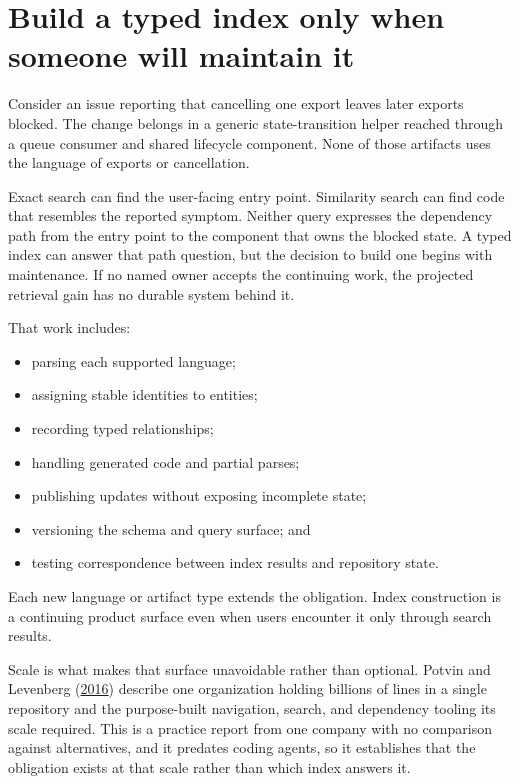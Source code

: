 \hypertarget{build-a-typed-index-only-when-someone-will-maintain-it}{%
\section{Build a typed index only when someone will maintain it}\label{build-a-typed-index-only-when-someone-will-maintain-it}}

Consider an issue reporting that cancelling one export leaves later exports blocked. The change belongs in a generic state-transition helper reached through a queue consumer and shared lifecycle component. None of those artifacts uses the language of exports or cancellation.

Exact search can find the user-facing entry point. Similarity search can find code that resembles the reported symptom. Neither query expresses the dependency path from the entry point to the component that owns the blocked state. A typed index can answer that path question, but the decision to build one begins with maintenance. If no named owner accepts the continuing work, the projected retrieval gain has no durable system behind it.


That work includes:

\begin{itemize}
\tightlist
\item
  parsing each supported language;
\item
  assigning stable identities to entities;
\item
  recording typed relationships;
\item
  handling generated code and partial parses;
\item
  publishing updates without exposing incomplete state;
\item
  versioning the schema and query surface; and
\item
  testing correspondence between index results and repository state.
\end{itemize}

Each new language or artifact type extends the obligation. Index construction is a continuing product surface even when users encounter it only through search results.

Scale is what makes that surface unavoidable rather than optional. Potvin and Levenberg (\href{https://doi.org/10.1145/2854146}{2016}) describe one organization holding billions of lines in a single repository and the purpose-built navigation, search, and dependency tooling its scale required. This is a practice report from one company with no comparison against alternatives, and it predates coding agents, so it establishes that the obligation exists at that scale rather than which index answers it.

